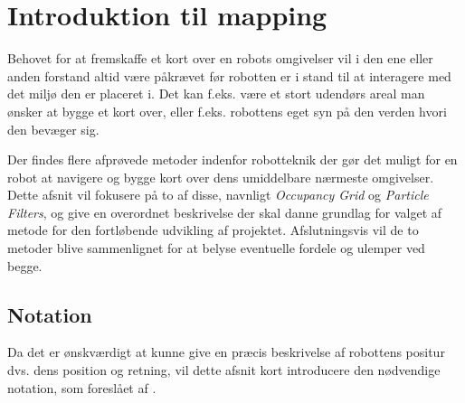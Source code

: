 \section{Introduktion til mapping}\label{mapping}
Behovet for at fremskaffe et kort over en robots omgivelser vil i den ene eller anden forstand altid være påkrævet før robotten er i stand til at interagere med det miljø den er placeret i.
Det kan f.eks. være et stort udendørs areal man ønsker at bygge et kort over, eller f.eks. robottens eget syn på den verden hvori den bevæger sig.

Der findes flere afprøvede metoder indenfor robotteknik der gør det muligt for en robot at navigere og bygge kort over dens umiddelbare nærmeste omgivelser.
Dette afsnit vil fokusere på to af disse, navnligt \textit{Occupancy Grid} og \textit{Particle Filters}, og give en overordnet beskrivelse der skal danne grundlag for valget af metode for den fortløbende udvikling af projektet.
Afslutningsvis vil de to metoder blive sammenlignet for at belyse eventuelle fordele og ulemper ved begge.

\subsection{Notation}
Da det er ønskværdigt at kunne give en præcis beskrivelse af robottens positur dvs. dens position og retning, vil dette afsnit kort introducere den nødvendige notation, som foreslået af \citet[s.~16-21]{probabilisticRobotics}.

